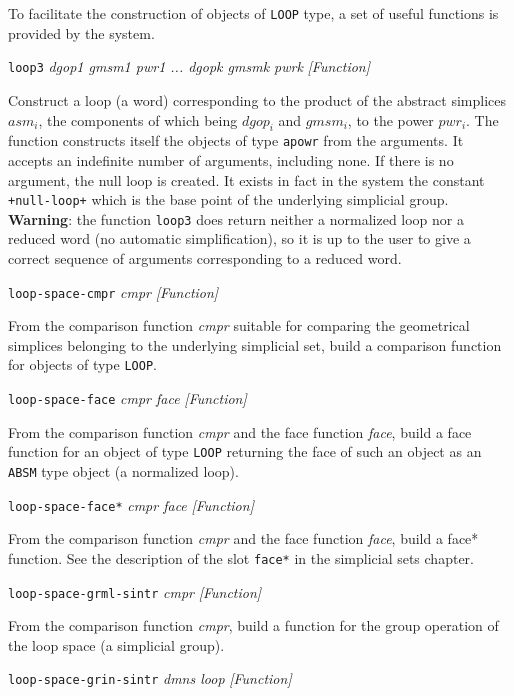 To facilitate the construction of objects of {\tt LOOP} type,
a set of useful functions is provided by the system.
\vskip 0.50cm
{\parindent=0mm
{\leftskip=5mm 
{\tt loop3} {\em dgop1 gmsm1 pwr1 ... dgopk gmsmk pwrk} \hfill {\em [Function]} \par}
{\leftskip=15mm 
Construct a  loop (a word) corresponding to the product of the abstract simplices $asm_i$, the components
of which being $dgop_i$ and $gmsm_i$,  to
the power $pwr_i$. The function constructs  itself the  objects of type {\tt apowr}  from the arguments.
It  accepts an indefinite number of arguments, including none.
If there is no argument, the null loop is created. It exists in fact in the system
the constant {\tt +null-loop+} which is  the base point of the underlying simplicial group.
{\bf Warning}: the function {\tt loop3} does 
return neither a normalized loop nor a reduced word (no automatic simplification), 
so it is up to the user to give a correct sequence of arguments 
cor\-res\-pon\-ding to  a reduced word.
\par}
{\leftskip=5mm 
{\tt loop-space-cmpr} {\em cmpr} \hfill {\em [Function]}  \par}
{\leftskip=15mm 
From the comparison function {\em cmpr} suitable for comparing the geometrical simplices belonging to the
underlying simplicial set, build a comparison function for objects of type {\tt LOOP}. \par}
{\leftskip=5mm 
{\tt loop-space-face} {\em cmpr face} \hfill {\em [Function]}  \par}
{\leftskip=15mm 
From the comparison function {\em cmpr} and the face function {\em face}, build a face function
for an object of type {\tt LOOP} returning the face of such an object  as an {\tt ABSM} type object
(a normalized loop). \par}
{\leftskip=5mm 
{\tt loop-space-face*} {\em cmpr face} \hfill {\em [Function]}  \par}
{\leftskip=15mm 
From the comparison function {\em cmpr} and the face function {\em face}, build a face* function.
See the description of the slot {\tt face*} in the simplicial sets chapter. \par}
{\leftskip=5mm 
{\tt loop-space-grml-sintr} {\em cmpr} \hfill {\em [Function]}  \par}
{\leftskip=15mm 
From the comparison function {\em cmpr}, build a function for the group operation of the loop space
(a simplicial group). \par}
{\leftskip=5mm 
{\tt loop-space-grin-sintr} {\em dmns loop} \hfill {\em [Function]}  \par}
}
